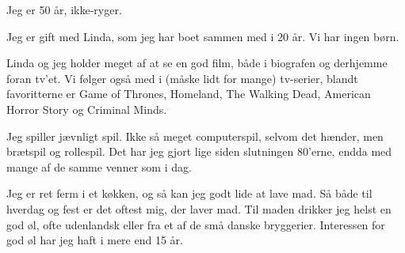 \documentclass[a4paper,11pt]{article}
\begin{document}
Jeg er 50 år, ikke-ryger.

Jeg er gift med Linda, som jeg har boet sammen med i 20 år. Vi har
ingen børn.

Linda og jeg holder meget af at se en god film, både i biografen og
derhjemme foran tv’et. Vi følger også med i (måske lidt for mange)
tv-serier, blandt favoritterne er Game of Thrones, Homeland, The
Walking Dead, American Horror Story og Criminal Minds.

Jeg spiller jævnligt spil. Ikke så meget computerspil, selvom det
hænder, men brætspil og rollespil. Det har jeg gjort lige siden
slutningen 80’erne, endda med mange af de samme venner som i dag.

Jeg er ret ferm i et køkken, og så kan jeg godt lide at lave mad. Så
både til hverdag og fest er det oftest mig, der laver mad. Til maden
drikker jeg helst en god øl, ofte udenlandsk eller fra et af de små
danske bryggerier. Interessen for god øl har jeg haft i mere end 15
år.
\end{document}
